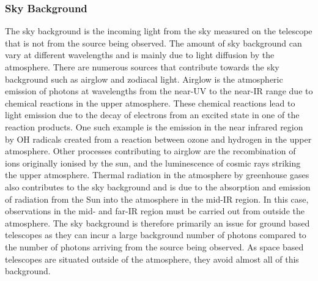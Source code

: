 	\subsubsection{Sky Background} %
	\label{ssub:sky_background}
		The sky background is the incoming light from the sky measured on the telescope that is not from the source being observed. The amount of sky background can vary at different wavelengths and is mainly due to light diffusion by the atmosphere. There are numerous sources that contribute towards the sky background such as airglow and zodiacal light. Airglow is the atmospheric emission of photons at wavelengths from the near-UV to the near-IR range due to chemical reactions in the upper atmosphere\cite[p.~9]{atmospheric_radiation_model}. These chemical reactions lead to light emission due to the decay of electrons from an excited state in one of the reaction products. One such example is the emission in the near infrared region by OH radicals created from a reaction between ozone and hydrogen in the upper atmosphere\cite{residual_OH_emission}. Other processes contributing to airglow are the recombination of ions originally ionised by the sun, and the luminescence of cosmic rays striking the upper atmosphere. Thermal radiation in the atmosphere by greenhouse gases also contributes to the sky background and is due to the absorption and emission of radiation from the Sun into the atmosphere in the mid-IR region. In this case, observations in the mid- and far-IR region must be carried out from outside the atmosphere\cite[p.~22--23]{Peter_Schneider_IR}. The sky background is therefore primarily an issue for ground based telescopes as they can incur a large background number of photons compared to the number of photons arriving from the source being observed. As space based telescopes are situated outside of the atmosphere, they avoid almost all of this background.

